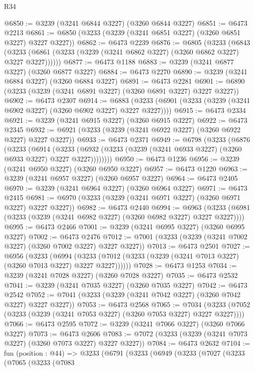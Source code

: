 \begin{lexlean}{R34}
\begin{coremodule}
@6850 := @3239 (@3241 @6844 @3227) (@3260 @6844 @3227)
@6851 := @6473 @2213
@6861 := @6850 (@3233 (@3239 (@3241 @6851 @3227) (@3260 @6851 @3227) @3227 @3227))
@6862 := @6473 @2239
@6876 := @6805
    (@3233
      (@6843 (@3233 (@6861 (@3233 (@3239 (@3241 @6862 @3227) (@3260 @6862 @3227) @3227 @3227))))))
@6877 := @6473 @1188
@6883 := @3239 (@3241 @6877 @3227) (@3260 @6877 @3227)
@6884 := @6473 @2270
@6890 := @3239 (@3241 @6884 @3227) (@3260 @6884 @3227)
@6891 := @6473 @2281
@6901 := @6890 (@3233 (@3239 (@3241 @6891 @3227) (@3260 @6891 @3227) @3227 @3227))
@6902 := @6473 @2307
@6914 := @6883 (@3233 (@6901 (@3233 (@3239 (@3241 @6902 @3227) (@3260 @6902 @3227) @3227 @3227))))
@6915 := @6473 @2334
@6921 := @3239 (@3241 @6915 @3227) (@3260 @6915 @3227)
@6922 := @6473 @2345
@6932 := @6921 (@3233 (@3239 (@3241 @6922 @3227) (@3260 @6922 @3227) @3227 @3227))
@6933 := @6473 @2371
@6949 := @6798
    (@3233
      (@6876
        (@3233
          (@6914
            (@3233 (@6932 (@3233 (@3239 (@3241 @6933 @3227) (@3260 @6933 @3227) @3227 @3227))))))))
@6950 := @6473 @1236
@6956 := @3239 (@3241 @6950 @3227) (@3260 @6950 @3227)
@6957 := @6473 @1220
@6963 := @3239 (@3241 @6957 @3227) (@3260 @6957 @3227)
@6964 := @6473 @2405
@6970 := @3239 (@3241 @6964 @3227) (@3260 @6964 @3227)
@6971 := @6473 @2415
@6981 := @6970 (@3233 (@3239 (@3241 @6971 @3227) (@3260 @6971 @3227) @3227 @3227))
@6982 := @6473 @2440
@6994 := @6963 (@3233 (@6981 (@3233 (@3239 (@3241 @6982 @3227) (@3260 @6982 @3227) @3227 @3227))))
@6995 := @6473 @2466
@7001 := @3239 (@3241 @6995 @3227) (@3260 @6995 @3227)
@7002 := @6473 @2476
@7012 := @7001 (@3233 (@3239 (@3241 @7002 @3227) (@3260 @7002 @3227) @3227 @3227))
@7013 := @6473 @2501
@7027 := @6956
    (@3233
      (@6994 (@3233 (@7012 (@3233 (@3239 (@3241 @7013 @3227) (@3260 @7013 @3227) @3227 @3227))))))
@7028 := @6473 @1253
@7034 := @3239 (@3241 @7028 @3227) (@3260 @7028 @3227)
@7035 := @6473 @2532
@7041 := @3239 (@3241 @7035 @3227) (@3260 @7035 @3227)
@7042 := @6473 @2542
@7052 := @7041 (@3233 (@3239 (@3241 @7042 @3227) (@3260 @7042 @3227) @3227 @3227))
@7053 := @6473 @2568
@7065 := @7034 (@3233 (@7052 (@3233 (@3239 (@3241 @7053 @3227) (@3260 @7053 @3227) @3227 @3227))))
@7066 := @6473 @2595
@7072 := @3239 (@3241 @7066 @3227) (@3260 @7066 @3227)
@7073 := @6473 @2606
@7083 := @7072 (@3233 (@3239 (@3241 @7073 @3227) (@3260 @7073 @3227) @3227 @3227))
@7084 := @6473 @2632
@7104 := fun (position : @44) =>
  @3233
    (@6791
      (@3233
        (@6949
          (@3233
            (@7027
              (@3233
                (@7065
                  (@3233
                    (@7083

\end{coremodule}
\end{lexlean}

